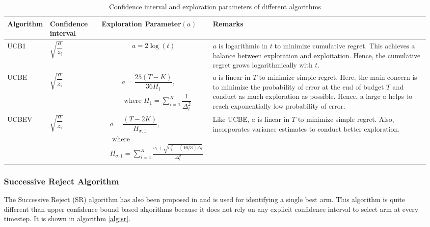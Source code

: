 \begin{table}
\caption{Confidence interval and exploration parameters of different algorithms}
\label{table:comp-exp}
\begin{center}
\begin{tabular}{|p{5em}|p{4em}|p{11em}|p{11em}|}
\hline
Algorithm  &  Confidence interval & Exploration Parameter$(a)$ & Remarks \\
\hline
\hline
UCB1       & $\sqrt{\dfrac{a}{z_i}}$ & \begin{align*}a = 2\log (t)\end{align*} & $a$ is logarithmic in $t$ to minimize cumulative regret. This achieves a balance between exploration and exploitation. Hence, the cumulative regret grows logarithmically with $t$. \\%
\hline
\hline
UCBE       & $\sqrt{\dfrac{a}{z_i}}$ & {\begin{align*}& a = \dfrac{25(T-K)}{36 H_1},\\& \text{ where }H_1 = \sum_{i=1}^{K}\dfrac{1}{\Delta_i^2} 
\end{align*} }
& $a$ is linear in $T$ to minimize simple regret. Here, the main concern is to minimize the probability of error at the end of budget $T$ and conduct as much exploration as possible. Hence, a large $a$ helps to reach exponentially low probability of error.\\
\hline
\hline
UCBEV      & $\sqrt{\dfrac{a}{z_i}}$ & {\begin{align*} & a = \dfrac{(T-2K)}{H_{\sigma,1}},\\ &\text{ where } \\  & H_{\sigma,1}=\sum_{i=1}^{K}\frac{\sigma_{i}+\sqrt{\sigma_{i}^{2}+(16/3)\Delta_{i}}}{\Delta_{i}^{2}} 
\end{align*}}
& Like UCBE, $a$ is linear in $T$ to minimize simple regret. Also, incorporates variance estimates to conduct better exploration.\\\midrule
\end{tabular}
\end{center}
\end{table}


\subsubsection{Successive Reject Algorithm}

The Successive Reject (SR) algorithm has also been proposed in \citet{audibert2010best} and is used for identifying a single best arm. This algorithm is quite different than upper confidence bound based algorithms because it does not rely on any explicit confidence interval to select arm at every timestep. It is shown in algorithm \ref{alg:sr}.


